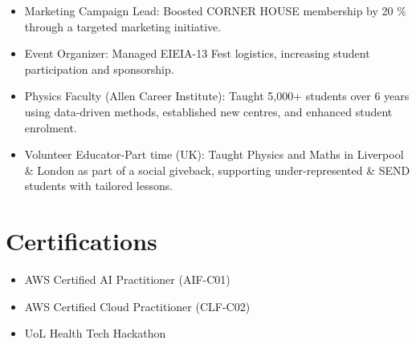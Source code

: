 \documentclass[a4paper,9pt]{article} %
\begin{document}
\begin{itemize}[left=0pt, itemsep=0pt] \item Marketing Campaign Lead: Boosted CORNER HOUSE membership by 20 \% through a targeted marketing initiative. \item Event Organizer: Managed EIEIA-13 Fest logistics, increasing student participation and sponsorship. \item Physics Faculty (Allen Career Institute): Taught 5,000+ students over 6 years using data-driven methods, established new centres, and enhanced student enrolment. \item Volunteer Educator-Part time (UK): Taught Physics and Maths in Liverpool \& London as part of a social giveback, supporting under-represented \& SEND students with tailored lessons. \end{itemize}




\section*{Certifications }


\begin{itemize}[left=0pt, itemsep=0pt]
    \item AWS Certified AI Practitioner (AIF-C01)
    \item AWS Certified Cloud Practitioner (CLF-C02)
    \item UoL Health Tech Hackathon
\end{itemize}
\end{document}
